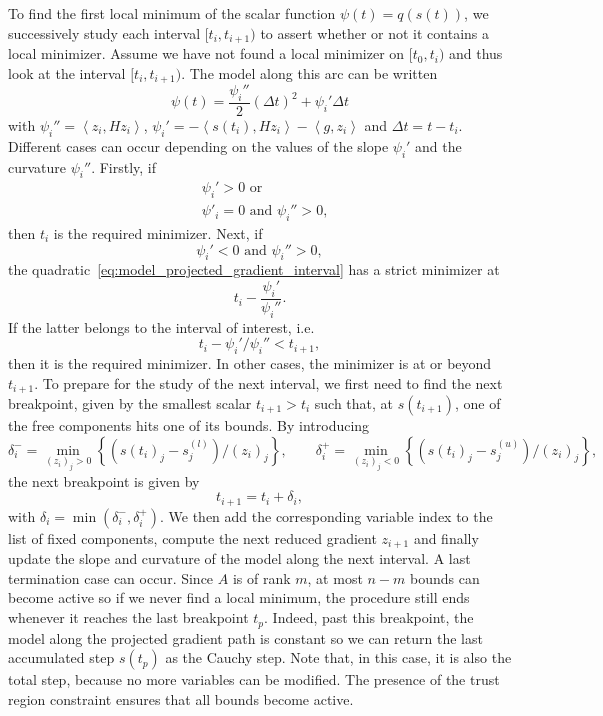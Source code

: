 \documentclass{article}
\numberwithin{equation}{section}
\newcommand{\inner}[2]{\left\langle {#1} , {#2} \right\rangle} %
\theoremstyle{plain}
\begin{document}
				To find the first local minimum of the scalar function $\psi(t) = q(s(t))$, we successively study each interval $[t_i,t_{i+1})$ to assert whether or not it contains a local minimizer.
				Assume we have not found a local minimizer on $[t_0,t_i)$ and thus look at the interval $[t_i,t_{i+1})$. The model along this arc can be written
				\begin{equation}\label{eq:model_projected_gradient_interval}
					\psi(t) = \dfrac{\psi_i''}{2}(\Delta t)^2 + \psi_i'\Delta t
				\end{equation}
				with
				$\psi_i'' = \inner{z_i}{Hz_i}$, $\psi_i' = -\inner{s(t_i)}{Hz_i} - \inner{g}{z_i}$ and $\Delta t = t-t_i$.
				Different cases can occur depending on the values of the slope $\psi_i'$ and the curvature $\psi_i''$. 
				Firstly, if
				\begin{align*}
					&\psi_i' > 0 \text{ or } \\
					&\psi'_i=0 \text{ and } \psi_i'' > 0,
				\end{align*}
				then $t_i$ is the required minimizer. Next, if
				\[\psi_i' < 0 \text{ and } \psi_i'' > 0,\]
				the quadratic~\eqref{eq:model_projected_gradient_interval} has a strict minimizer at
				\[t_i- \dfrac{\psi_i'}{\psi_i''}.\]
				If the latter belongs to the interval of interest, i.e. 
				\[t_i-\psi_i'/\psi_i'' < t_{i+1},\]
				then it is the required minimizer. In other cases, the minimizer is at or beyond $t_{i+1}$. To prepare for the study of the next interval, we first need to find the next breakpoint, given by the smallest scalar $t_{i+1}>t_i$ such that, at $s(t_{i+1})$, one of the free components hits one of its bounds. By introducing
				\[\delta_i^- = \min_{(z_i)_j > 0} \left\{ (s(t_i)_j - s^{(l)}_j)/(z_i)_j\right\}, \qquad \delta_i^+ = \min_{(z_i)_j < 0} \left\{(s(t_i)_j - s^{(u)}_j)/(z_i)_j\right\},\]
				the next breakpoint is given by 
				\begin{equation}\label{eq:next_breakpoint}
					t_{i+1} = t_i + \delta_i,
				\end{equation} 
				with $\delta_i = \min\left(\delta_i^-,\delta_i^+\right)$. We then add the corresponding variable index to the list of fixed components, compute the next reduced gradient $z_{i+1}$ and finally update the slope and curvature of the model along the next interval. A last termination case can occur. Since $A$ is of rank $m$, at most $n-m$ bounds can become active so if we never find a local minimum, the procedure still ends whenever it reaches the last breakpoint $t_{p}$. Indeed, past this breakpoint, the model along the projected gradient path is constant so we can return the last accumulated step $s(t_p)$ as the Cauchy step. Note that, in this case, it is also the total step, because no more variables can be modified. The presence of the trust region constraint ensures that all bounds become active. 
\end{document}
